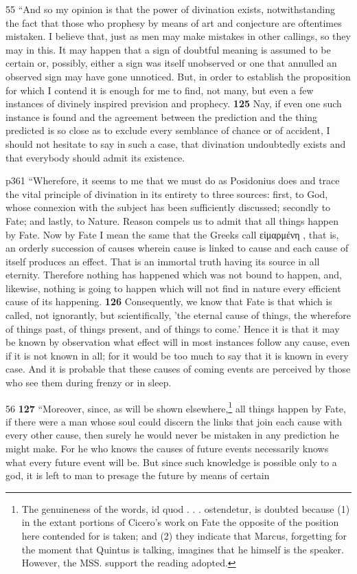 55
``And so my opinion is that the power of divination exists, notwithstanding the fact that those who prophesy by means of art and conjecture are oftentimes mistaken. I believe that, just as men may make mistakes in other callings, so they may in this. It may happen that a sign of doubtful meaning is assumed to be certain or, possibly, either a sign was itself unobserved or one that annulled an observed sign may have gone unnoticed. But, in order to establish the proposition for which I contend it is enough for me to find, not many, but even a few instances of divinely inspired prevision and prophecy. \textbf{125} Nay, if even one such instance is found and the agreement between the prediction and the thing predicted is so close as to exclude every semblance of chance or of accident, I should not hesitate to say in such a case, that divination undoubtedly exists and that everybody should admit its existence.

p361
``Wherefore, it seems to me that we must do as Posidonius does and trace the vital principle of divination in its entirety to three sources: first, to God, whose connexion with the subject has been sufficiently discussed; secondly to Fate; and lastly, to Nature. Reason compels us to admit that all things happen by Fate. Now by Fate I mean the same that the Greeks call \textgreek{ε\texthebrew{ἱ}μαρμένη} , that is, an orderly succession of causes wherein cause is linked to cause and each cause of itself produces an effect. That is an immortal truth having its source in all eternity. Therefore nothing has happened which was not bound to happen, and, likewise, nothing is going to happen which will not find in nature every efficient cause of its happening. \textbf{126} Consequently, we know that Fate is that which is called, not ignorantly, but scientifically, 'the eternal cause of things, the wherefore of things past, of things present, and of things to come.' Hence it is that it may be known by observation what effect will in most instances follow any cause, even if it is not known in all; for it would be too much to say that it is known in every case. And it is probable that these causes of coming events are perceived by those who see them during frenzy or in sleep.

56
\textbf{127} ``Moreover, since, as will be shown elsewhere,\texthebrew{}\footnote{The genuineness of the words, id quod . . . ostendetur, is doubted because (1) in the extant portions of Cicero's work on Fate the opposite of the position here contended for is taken; and (2) they indicate that Marcus, forgetting for the moment that Quintus is talking, imagines that he himself is the speaker. However, the MSS. support the reading adopted.

} all things happen by Fate, if there were a man whose soul could discern the links that join each cause with every other cause, then surely he would never be mistaken in any prediction he might make. For he who knows the causes of future events necessarily knows what every future event will be. But since such knowledge is possible only to a god, it is left to man to presage the future by means of certain


